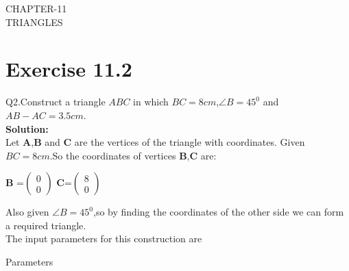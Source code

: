 \documentclass{article}
\let\vec\mathbf
\begin{document}
\begin{center}
        \textbf\large{CHAPTER-11 \\ TRIANGLES}
\end{center}
\section{Exercise 11.2}
Q2.Construct a triangle $ABC$ in which $BC=8cm$,$\angle{B}=45^0$ and $AB-AC=3.5cm$. \\
\textbf{Solution:}\\
Let $\vec{A}$,$\vec{B}$ and $\vec{C}$ are the vertices of the triangle with coordinates.
Given $BC=8cm$.So the coordinates of vertices $\vec{B}$,$\vec{C}$ are:
\begin{center}
{
$\vec{B}$ =$\begin{pmatrix}
0 \\
0 
\end{pmatrix}$ 
\vspace{1mm}
$\vec{C}$=$\begin{pmatrix}
8 \\
0
\end{pmatrix}$ 
\vspace{1mm}
}
\end{center}
Also given $\angle{B}=45^0$,so by finding the coordinates of the other side we can form a required triangle. \\
 \vspace{2mm}
 The input parameters for this construction are
 \begin{table}[h]
	  \centering
	  
	  \caption{Parameters}
	  \label{tab:Table1}
\end{table}
\end{document}
